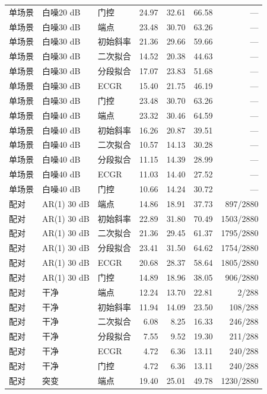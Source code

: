 \begin{longtable}{lllrrrr}
单场景 & 白噪20 dB & 门控 & 24.97 & 32.61 & 66.58 & — \\
单场景 & 白噪30 dB & 端点 & 23.48 & 30.70 & 63.26 & — \\
单场景 & 白噪30 dB & 初始斜率 & 21.36 & 29.66 & 59.66 & — \\
单场景 & 白噪30 dB & 二次拟合 & 14.52 & 20.38 & 44.63 & — \\
单场景 & 白噪30 dB & 分段拟合 & 17.07 & 23.83 & 51.68 & — \\
单场景 & 白噪30 dB & ECGR & 15.40 & 21.75 & 46.19 & — \\
单场景 & 白噪30 dB & 门控 & 23.48 & 30.70 & 63.26 & — \\
单场景 & 白噪40 dB & 端点 & 23.32 & 30.46 & 64.59 & — \\
单场景 & 白噪40 dB & 初始斜率 & 16.26 & 20.87 & 39.51 & — \\
单场景 & 白噪40 dB & 二次拟合 & 10.57 & 14.13 & 30.28 & — \\
单场景 & 白噪40 dB & 分段拟合 & 11.15 & 14.39 & 28.99 & — \\
单场景 & 白噪40 dB & ECGR & 11.03 & 14.40 & 27.52 & — \\
单场景 & 白噪40 dB & 门控 & 10.66 & 14.24 & 30.72 & — \\
配对 & AR(1) 30 dB & 端点 & 14.86 & 18.91 & 37.73 & 897/2880 \\
配对 & AR(1) 30 dB & 初始斜率 & 22.89 & 31.80 & 70.49 & 1503/2880 \\
配对 & AR(1) 30 dB & 二次拟合 & 21.36 & 29.45 & 61.37 & 1795/2880 \\
配对 & AR(1) 30 dB & 分段拟合 & 23.41 & 31.50 & 64.62 & 1754/2880 \\
配对 & AR(1) 30 dB & ECGR & 20.68 & 28.37 & 58.64 & 1805/2880 \\
配对 & AR(1) 30 dB & 门控 & 14.89 & 18.96 & 38.05 & 906/2880 \\
配对 & 干净 & 端点 & 12.24 & 13.70 & 22.81 & 2/288 \\
配对 & 干净 & 初始斜率 & 11.94 & 14.09 & 23.50 & 108/288 \\
配对 & 干净 & 二次拟合 & 6.08 & 8.25 & 16.33 & 246/288 \\
配对 & 干净 & 分段拟合 & 7.55 & 9.52 & 19.30 & 211/288 \\
配对 & 干净 & ECGR & 4.72 & 6.36 & 13.11 & 240/288 \\
配对 & 干净 & 门控 & 4.72 & 6.36 & 13.11 & 240/288 \\
配对 & 突变 & 端点 & 19.40 & 25.01 & 49.78 & 1230/2880 \\

\end{longtable}
